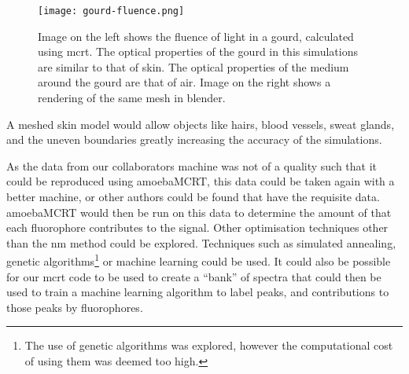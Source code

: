 \begin{figure}[!htpb]
    \centering
    \texttt{[image: gourd-fluence.png]}
    \caption{Image on the left shows the fluence of light in a gourd, calculated using \gls*{mcrt}. The optical properties of the gourd in this simulations are similar to that of skin. The optical properties of the medium around the gourd are that of air. Image on the right shows a rendering of the same mesh in blender.}
    \label{fig:mesh}
\end{figure}

A meshed skin model would allow objects like hairs, blood vessels, sweat glands, and the uneven boundaries greatly increasing the accuracy of the simulations.

As the data from our collaborators machine was not of a quality such that it could be reproduced using amoebaMCRT, this data could be taken again with a better machine, or other authors could be found that have the requisite data. 
amoebaMCRT would then be run on this data to determine the amount of that each fluorophore contributes to the signal.
Other optimisation techniques other than the \gls*{nm} method could be explored.
Techniques such as simulated annealing, genetic algorithms\footnote{The use of genetic algorithms was explored, however the computational cost of using them was deemed too high.} or machine learning could be used.
It could also be possible for our \gls*{mcrt} code to be used to create a ``bank'' of spectra that could then be used to train a machine learning algorithm to label peaks, and contributions to those peaks by fluorophores.
